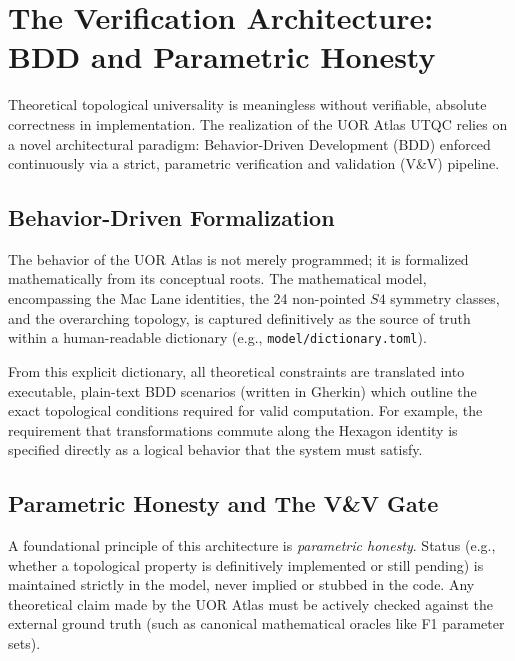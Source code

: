 \section{The Verification Architecture: BDD and Parametric Honesty}

Theoretical topological universality is meaningless without verifiable, absolute correctness in implementation. The realization of the UOR Atlas UTQC relies on a novel architectural paradigm: Behavior-Driven Development (BDD) enforced continuously via a strict, parametric verification and validation (V\&V) pipeline.

\subsection{Behavior-Driven Formalization}
The behavior of the UOR Atlas is not merely programmed; it is formalized mathematically from its conceptual roots. The mathematical model, encompassing the Mac Lane identities, the 24 non-pointed $S4$ symmetry classes, and the overarching topology, is captured definitively as the source of truth within a human-readable dictionary (e.g., \texttt{model/dictionary.toml}).

From this explicit dictionary, all theoretical constraints are translated into executable, plain-text BDD scenarios (written in Gherkin) which outline the exact topological conditions required for valid computation. For example, the requirement that transformations commute along the Hexagon identity is specified directly as a logical behavior that the system must satisfy.

\subsection{Parametric Honesty and The V\&V Gate}
A foundational principle of this architecture is \textit{parametric honesty}. Status (e.g., whether a topological property is definitively implemented or still pending) is maintained strictly in the model, never implied or stubbed in the code. Any theoretical claim made by the UOR Atlas must be actively checked against the external ground truth (such as canonical mathematical oracles like F1 parameter sets).

